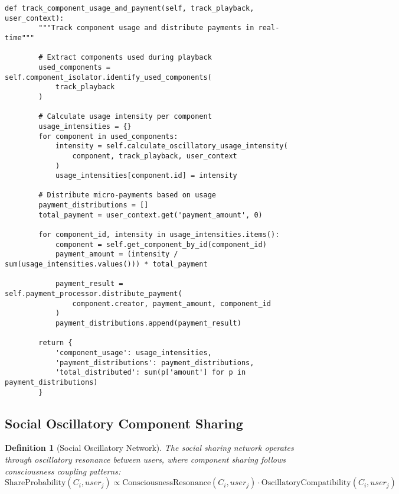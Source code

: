 \documentclass[12pt,a4paper]{article}
\newtheorem{definition}{Definition}
\begin{document}
\begin{lstlisting}[style=pythonstyle, caption=Oscillatory Component Isolation and Distribution]
    def track_component_usage_and_payment(self, track_playback, user_context):
        """Track component usage and distribute payments in real-time"""
        
        # Extract components used during playback
        used_components = self.component_isolator.identify_used_components(
            track_playback
        )
        
        # Calculate usage intensity per component
        usage_intensities = {}
        for component in used_components:
            intensity = self.calculate_oscillatory_usage_intensity(
                component, track_playback, user_context
            )
            usage_intensities[component.id] = intensity
        
        # Distribute micro-payments based on usage
        payment_distributions = []
        total_payment = user_context.get('payment_amount', 0)
        
        for component_id, intensity in usage_intensities.items():
            component = self.get_component_by_id(component_id)
            payment_amount = (intensity / sum(usage_intensities.values())) * total_payment
            
            payment_result = self.payment_processor.distribute_payment(
                component.creator, payment_amount, component_id
            )
            payment_distributions.append(payment_result)
        
        return {
            'component_usage': usage_intensities,
            'payment_distributions': payment_distributions,
            'total_distributed': sum(p['amount'] for p in payment_distributions)
        }
\end{lstlisting}

\subsection{Social Oscillatory Component Sharing}

\begin{definition}[Social Oscillatory Network]
The social sharing network operates through oscillatory resonance between users, where component sharing follows consciousness coupling patterns:
\begin{equation}
\text{ShareProbability}(C_i, user_j) \propto \text{ConsciousnessResonance}(C_i, user_j) \cdot \text{OscillatoryCompatibility}(C_i, user_j)
\end{equation}
\end{definition}
\end{document}
